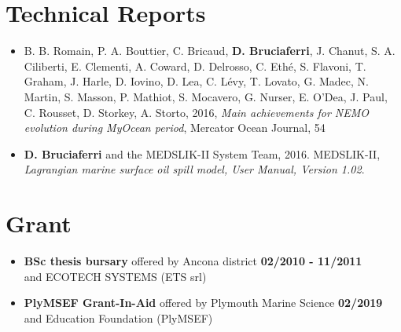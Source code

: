 \documentclass[a4paper, oneside, final]{scrartcl}
\begin{document}
\section{Technical Reports}
\noindent
\normalsize
\begin{itemize}
\item B. B. Romain, P. A. Bouttier, C. Bricaud, \textbf{D. Bruciaferri}, J. Chanut, S. A. Ciliberti, E. Clementi, A. Coward, D. Delrosso, C. Ethé, S. Flavoni, T. Graham, J. Harle, D. Iovino, D. Lea, C. Lévy, T. Lovato, G. Madec, N. Martin, S. Masson, P. Mathiot, S. Mocavero, G. Nurser, E. O’Dea, J. Paul, C. Rousset, D. Storkey, A. Storto, 2016, \textit{Main achievements for NEMO evolution during MyOcean period}, Mercator Ocean Journal, 54
\item \textbf{D. Bruciaferri} and the MEDSLIK-II System Team, 2016. MEDSLIK-II, \textit{Lagrangian marine surface oil spill model, User Manual, Version 1.02}.\\
\end{itemize}
\section{Grant}
\noindent
\normalsize
\begin{itemize}
\item  \textbf{BSc thesis bursary} offered by Ancona district \hspace{3.cm} \textbf{02/2010 - 11/2011} \\
         and ECOTECH SYSTEMS (ETS srl)\\
\item  \textbf{PlyMSEF Grant-In-Aid} offered by Plymouth Marine Science \hspace{2.4cm} \textbf{02/2019} \\
         and Education Foundation (PlyMSEF)\\      
\end{itemize}
\pagebreak
\end{document}
